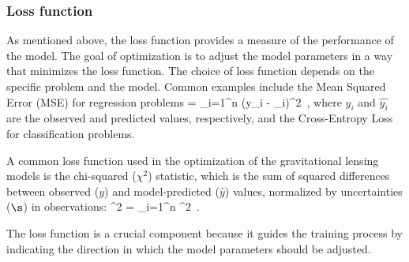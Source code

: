 \subsubsection{Loss function}
\label{subsubsec:loss_func}
As mentioned above, the loss function provides a measure of the performance of the model. The goal of optimization is to adjust the model parameters in a way that minimizes the loss function. The choice of loss function depends on the specific problem and the model.
Common examples include the Mean Squared Error (MSE) for regression problems
\be
\label{eq:4.8}
 =  \sum_{i=1}^n (y_i - _i)^2 \,,
\ee
where $y_i$ and $\hat{y_i}$ are the observed and predicted values, respectively, and the Cross-Entropy Loss for classification problems. 

A common loss function used in the optimization of the gravitational lensing models is the chi-squared ($\chi^2$) statistic, which is the sum of squared differences between observed ($y$) and model-predicted ($\hat{y}$) values, normalized by uncertainties ($\s$) in observations:
\be
\label{eq:4.9}
\chi^2 = \sum_{i=1}^n ^2 \,.
\ee

The loss function is a crucial component because it guides the training process by indicating the direction in which the model parameters should be adjusted. 


